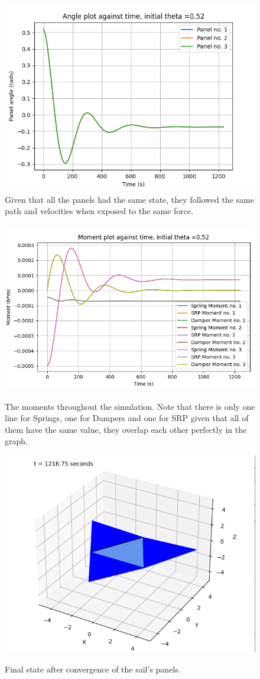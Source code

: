\begin{figure}[H]
\centering
  \includegraphics[width=0.7\linewidth]{images/third/forceconcentrictriangular.png}
\caption{Given that all the panels had the same state, they followed the same path and velocities when exposed to the same force.}
\label{angletriangular}
\end{figure}


\begin{figure}[H]
\centering
  \includegraphics[width=0.7\linewidth]{images/third/momentconcentrictriangular.png}
  \label{momentconcentric}
\caption{The moments throughout the simulation. Note that there is only one line for Springs, one for Dampers and one for SRP given that all of them have the same value, they overlap each other perfectly in the graph.}
\end{figure}

\begin{figure}[H]
\centering
  \includegraphics[width=0.7\linewidth]{images/third/concentrictriangular.png}
  \label{deployedtriangle}
\caption{Final state after convergence of the sail's panels.}
\end{figure}

